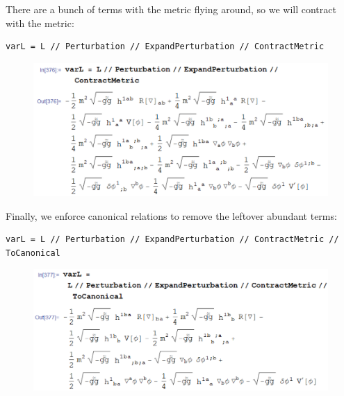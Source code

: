 \documentclass{book}
\theoremstyle{definition}
\begin{document}
There are a bunch of terms with the metric flying around, so we will contract with the metric:
\begin{lstlisting}
varL = L // Perturbation // ExpandPerturbation // ContractMetric
\end{lstlisting}
\begin{figure}[!htb]
	\includegraphics[scale=0.19]{varL3}
\end{figure}


Finally, we enforce canonical relations to remove the leftover abundant terms:
\begin{lstlisting}
varL = L // Perturbation // ExpandPerturbation // ContractMetric // 
ToCanonical
\end{lstlisting}
\begin{figure}[!htb]
	\includegraphics[scale=0.19]{varL4}
\end{figure}
\end{document}
